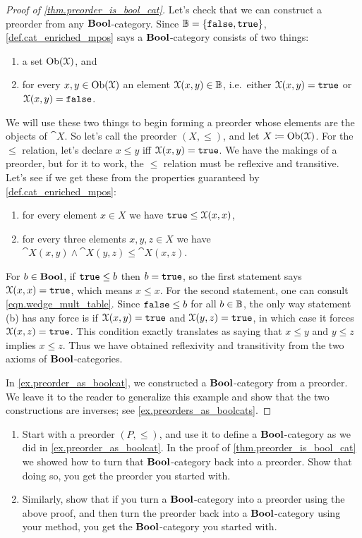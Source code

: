 \documentclass[7Sketches]{subfiles}
\begin{document}
\begin{proof}[Proof of \cref{thm.preorder_is_bool_cat}]
Let's check that we can construct a preorder from any $\mathbf{Bool}$-category. Since $\mathbb{B}=\{\mathtt{false},\mathtt{true}\}$, \cref{def.cat_enriched_mpos} says a
$\mathbf{Bool}$-category consists of two things:
\begin{enumerate}[label=(\roman*)]
	\item a set $\operatorname{Ob}(\mathcal{X})$, and
	\item for every $x,y\in \operatorname{Ob}(\mathcal{X})$ an element $\mathcal{X}(x,y)\in\mathbb{B}$, i.e.\ either $\mathcal{X}(x,y)=\mathtt{true}$ or $\mathcal{X}(x,y)=\mathtt{false}$. 
\end{enumerate}
We will use these two things to begin forming a preorder whose elements are the objects of $\cat{X}$. So let's call the preorder $(X,\leq)$, and let $X\coloneqq\operatorname{Ob}(\mathcal{X})$. For the $\leq$ relation, let's declare $x\leq y$ iff $\mathcal{X}(x,y)=\mathtt{true}$. We have the makings of a preorder, but for it to work, the $\leq$ relation must be reflexive and transitive. Let's see if we get these from the properties guaranteed by \cref{def.cat_enriched_mpos}:
\begin{enumerate}[label=(\alph*)]
	\item for every element $x\in X$ we have $\mathtt{true}\leq\mathcal{X}(x,x)$,
	\item for every three elements $x,y,z\in X$ we have $\cat{X}(x,y)\wedge\cat{X}(y,z)\leq\cat{X}(x,z)$.
\end{enumerate}
For $b\in\mathbf{Bool}$, if $\mathtt{true}\leq b$ then $b=\mathtt{true}$, so the first statement says
$\mathcal{X}(x,x)=\mathtt{true}$, which means $x\leq x$. For the second statement, one can
consult \cref{eqn.wedge_mult_table}. Since $\mathtt{false}\leq b$ for all $b\in\mathbb{B}$, the
only way statement (b) has any force is if $\mathcal{X}(x,y)=\mathtt{true}$ and $\mathcal{X}(y,z)=\mathtt{true}$, in which case it forces $\mathcal{X}(x,z)=\mathtt{true}$. This condition exactly translates as saying that $x\leq y$ and $y\leq z$ implies $x\leq z$. Thus we have obtained reflexivity and transitivity from the two axioms of $\mathbf{Bool}$-categories. 

In \cref{ex.preorder_as_boolcat}, we constructed a $\mathbf{Bool}$-category from a preorder.
We leave it to the reader to generalize this example and show that the two
constructions are inverses; see \cref{ex.preorders_as_boolcats}.
\end{proof}

\begin{exercise}%
\label{ex.preorders_as_boolcats}
  \begin{enumerate}
    \item Start with a preorder $(P,\le)$, and use it to define a $\mathbf{Bool}$-category as we did
      in \cref{ex.preorder_as_boolcat}. In the proof of \cref{thm.preorder_is_bool_cat} we
      showed how to turn that $\mathbf{Bool}$-category back into a preorder. Show that doing so,
      you get the preorder you started with. 

    \item Similarly, show that if you turn a $\mathbf{Bool}$-category into a preorder using the
      above proof, and then turn the preorder back into a $\mathbf{Bool}$-category using your
      method, you get the $\mathbf{Bool}$-category you started with.
      \qedhere
  \end{enumerate}
\end{exercise}
\end{document}
